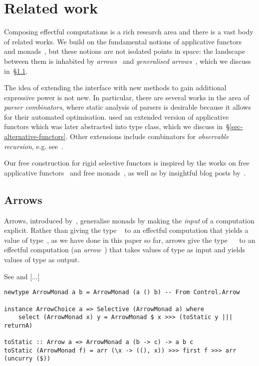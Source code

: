 \section{Related work}\label{sec-related}

Composing effectful computations is a rich research area and there is a vast
body of related works. We build on the fundamental notions of applicative
functors~\citep{mcbride2008applicative} and
monads~\citep{moggi1991notions,1995_wadler_monads}, but these notions are not
isolated points in space: the landscape between them is inhabited by
\emph{arrows}~\citep{hughes2000arrows} and \emph{generalised
arrows}~\citep{megacz2011hardware}, which we discuss in~\S\ref{sec-arrows}.

The idea of extending the  interface with new methods to gain
additional expressive power is not new. In particular, there are several works
in the area of \emph{parser combinators}, where static analysis of parsers is
desirable because it allows for their automated optimisation.
\citet{swierstra1996parsers} used an extended version of applicative functors
which was later abstracted into  type class, which we discuss
in~\S\ref{sec-alternative-functors}. Other extensions include combinators for
\emph{observable recursion}, e.g.
see~\citep{devriese2012finally,devriese2013fixing}.

Our free construction for rigid selective functors is inspired by the works
on free applicative functors~\citep{free-applicatives} and free
monads~\citep{swierstra2008data}, as well as by insightful blog posts
by~\citet{fancher2016free,fancher2017static}.

\subsection{Arrows}\label{sec-arrows}

Arrows, introduced by~\citet{hughes2000arrows}, generalise monads by making the
\emph{input} of a computation explicit. Rather than giving the type
~ to an effectful computation that yields a value of type~, as
we have done in this paper so far, arrows give the type ~~ to
an effectful computation (an \emph{arrow}~) that takes values of type
 as input and yields values of type  as output.

See \citet{lindley2011idioms} and \citet{rivas2017notions} [...]

\vspace{1mm}
\begin{verbatim}
newtype ArrowMonad a b = ArrowMonad (a () b) -- From Control.Arrow

instance ArrowChoice a => Selective (ArrowMonad a) where
    select (ArrowMonad x) y = ArrowMonad $ x >>> (toStatic y ||| returnA)

toStatic :: Arrow a => ArrowMonad a (b -> c) -> a b c
toStatic (ArrowMonad f) = arr (\x -> ((), x)) >>> first f >>> arr (uncurry ($))
\end{verbatim}
\vspace{1mm}

